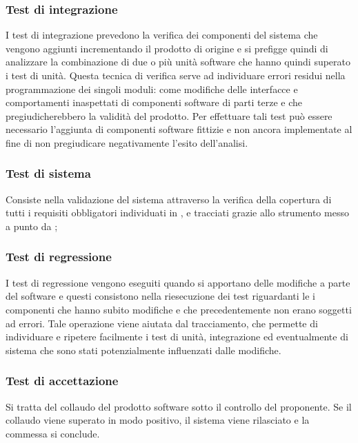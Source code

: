 \subsubsection{Test di integrazione}
I test di integrazione prevedono la verifica dei componenti del sistema che vengono aggiunti incrementando il prodotto di origine e si prefigge quindi di analizzare la combinazione di due o più unità software che hanno quindi superato i test di unità. Questa tecnica di verifica serve ad individuare errori residui nella programmazione dei singoli moduli: come modifiche delle interfacce e comportamenti inaspettati di componenti software di parti terze e che pregiudicherebbero la validità del prodotto. Per effettuare tali test può essere necessario l'aggiunta di componenti software fittizie e non ancora implementate al fine di non pregiudicare negativamente l'esito dell'analisi.
\subsubsection{Test di sistema}
Consiste nella validazione del sistema attraverso la verifica della copertura di tutti i requisiti obbligatori individuati in \infoAR, e tracciati  grazie allo strumento messo a punto da \gruppo;
\subsubsection{Test di regressione}
I test di regressione vengono eseguiti quando si apportano delle modifiche a parte del software e questi consistono nella riesecuzione dei test riguardanti le i componenti che hanno subito modifiche e che precedentemente non erano soggetti ad errori.
Tale operazione viene aiutata dal tracciamento, che permette di individuare e ripetere facilmente i test di unità, integrazione ed eventualmente di sistema che sono stati potenzialmente influenzati dalle modifiche.
\subsubsection{Test di accettazione}
Si tratta del collaudo del prodotto software sotto il controllo del proponente. Se il collaudo viene superato in modo positivo, il sistema viene rilasciato e la commessa si conclude.


